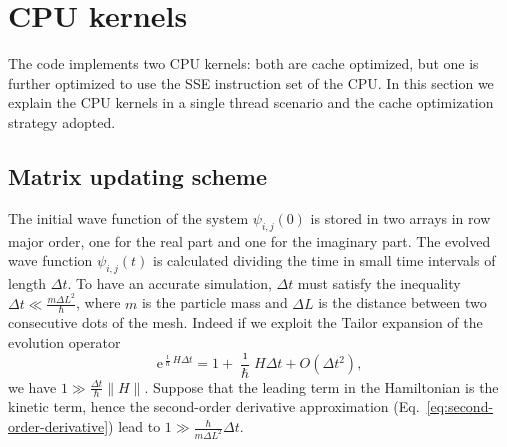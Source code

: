 
\section{CPU kernels}
The code implements two CPU kernels: both are  cache optimized, but one is further optimized to use the SSE instruction set of the CPU. In this section we explain the CPU kernels in a single thread scenario and the cache optimization strategy adopted.

\subsection{Matrix updating scheme}
The initial wave function of the system $\psi_{i,j}(0)$ is stored in two arrays in row major order, one for the real part and one for the imaginary part. The evolved wave function $\psi_{i,j}(t)$ is calculated dividing the time in small time intervals of length $\Delta t$. To have an accurate simulation, $\Delta t$ must satisfy the inequality $\Delta t \ll \frac{m \Delta L^2}{\hbar}$, where $m$ is the particle mass and $\Delta L$ is the distance between two consecutive dots of the mesh. Indeed if we exploit the Tailor expansion of the evolution operator
\begin{equation}
\mathrm{e}^{\frac{\imath}{\hbar}H\Delta t} = 1 + \frac{\imath}{\hbar}H\Delta t + O(\Delta t^2),
\end{equation} 
we have $1 \gg \frac{\Delta t}{\hbar}\parallel H \parallel $. Suppose that the leading term in the Hamiltonian is the kinetic term, hence the second-order derivative approximation (Eq.~\eqref{eq:second-order-derivative}) lead to $1 \gg \frac{\hbar}{m \Delta L^2} \Delta t$.

